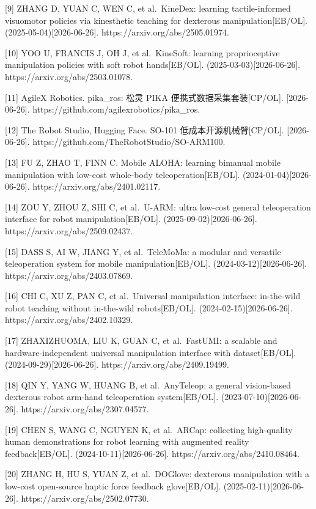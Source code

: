 \documentclass[
  chinese,
]{ctexart}
\begin{document}
{[}9{]} ZHANG D, YUAN C, WEN C, et al.~KineDex: learning
tactile-informed visuomotor policies via kinesthetic teaching for
dexterous manipulation{[}EB/OL{]}. (2025-05-04){[}2026-06-26{]}.
https://arxiv.org/abs/2505.01974.

{[}10{]} YOO U, FRANCIS J, OH J, et al.~KineSoft: learning
proprioceptive manipulation policies with soft robot hands{[}EB/OL{]}.
(2025-03-03){[}2026-06-26{]}. https://arxiv.org/abs/2503.01078.

{[}11{]} AgileX Robotics. pika\_ros: 松灵 PIKA
便携式数据采集套装{[}CP/OL{]}. {[}2026-06-26{]}.
https://github.com/agilexrobotics/pika\_ros.

{[}12{]} The Robot Studio, Hugging Face. SO-101
低成本开源机械臂{[}CP/OL{]}. {[}2026-06-26{]}.
https://github.com/TheRobotStudio/SO-ARM100.

{[}13{]} FU Z, ZHAO T, FINN C. Mobile ALOHA: learning bimanual mobile
manipulation with low-cost whole-body teleoperation{[}EB/OL{]}.
(2024-01-04){[}2026-06-26{]}. https://arxiv.org/abs/2401.02117.

{[}14{]} ZOU Y, ZHOU Z, SHI C, et al.~U-ARM: ultra low-cost general
teleoperation interface for robot manipulation{[}EB/OL{]}.
(2025-09-02){[}2026-06-26{]}. https://arxiv.org/abs/2509.02437.

{[}15{]} DASS S, AI W, JIANG Y, et al.~TeleMoMa: a modular and versatile
teleoperation system for mobile manipulation{[}EB/OL{]}.
(2024-03-12){[}2026-06-26{]}. https://arxiv.org/abs/2403.07869.

{[}16{]} CHI C, XU Z, PAN C, et al.~Universal manipulation interface:
in-the-wild robot teaching without in-the-wild robots{[}EB/OL{]}.
(2024-02-15){[}2026-06-26{]}. https://arxiv.org/abs/2402.10329.

{[}17{]} ZHAXIZHUOMA, LIU K, GUAN C, et al.~FastUMI: a scalable and
hardware-independent universal manipulation interface with
dataset{[}EB/OL{]}. (2024-09-29){[}2026-06-26{]}.
https://arxiv.org/abs/2409.19499.

{[}18{]} QIN Y, YANG W, HUANG B, et al.~AnyTeleop: a general
vision-based dexterous robot arm-hand teleoperation system{[}EB/OL{]}.
(2023-07-10){[}2026-06-26{]}. https://arxiv.org/abs/2307.04577.

{[}19{]} CHEN S, WANG C, NGUYEN K, et al.~ARCap: collecting high-quality
human demonstrations for robot learning with augmented reality
feedback{[}EB/OL{]}. (2024-10-11){[}2026-06-26{]}.
https://arxiv.org/abs/2410.08464.

{[}20{]} ZHANG H, HU S, YUAN Z, et al.~DOGlove: dexterous manipulation
with a low-cost open-source haptic force feedback glove{[}EB/OL{]}.
(2025-02-11){[}2026-06-26{]}. https://arxiv.org/abs/2502.07730.
\end{document}
